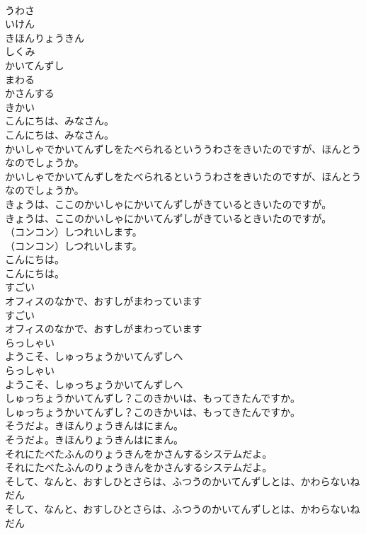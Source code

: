 \documentclass[8pt]{extreport}
\begin{document}
\begin{CJK}{UTF8}{min}
\\	うわさ
\\	いけん
\\	きほんりょうきん
\\	しくみ
\\	かいてんずし
\\	まわる
\\	かさんする
\\	きかい
\\	こんにちは、みなさん。
\\	こんにちは、みなさん。
\\	かいしゃでかいてんずしをたべられるといううわさをきいたのですが、ほんとうなのでしょうか。
\\	かいしゃでかいてんずしをたべられるといううわさをきいたのですが、ほんとうなのでしょうか。
\\	きょうは、ここのかいしゃにかいてんずしがきているときいたのですが。
\\	きょうは、ここのかいしゃにかいてんずしがきているときいたのですが。
\\	（コンコン）しつれいします。
\\	（コンコン）しつれいします。
\\	こんにちは。
\\	こんにちは。
\\	すごい
\\	オフィスのなかで、おすしがまわっています
\\	すごい
\\	オフィスのなかで、おすしがまわっています
\\	らっしゃい
\\	ようこそ、しゅっちょうかいてんずしへ
\\	らっしゃい
\\	ようこそ、しゅっちょうかいてんずしへ
\\	しゅっちょうかいてんずし？このきかいは、もってきたんですか。
\\	しゅっちょうかいてんずし？このきかいは、もってきたんですか。
\\	そうだよ。きほんりょうきんはにまん。
\\	そうだよ。きほんりょうきんはにまん。
\\	それにたべたふんのりょうきんをかさんするシステムだよ。
\\	それにたべたふんのりょうきんをかさんするシステムだよ。
\\	そして、なんと、おすしひとさらは、ふつうのかいてんずしとは、かわらないねだん
\\	そして、なんと、おすしひとさらは、ふつうのかいてんずしとは、かわらないねだん

\end{CJK}
\end{document}
